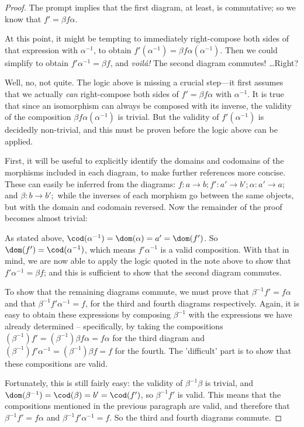 \documentclass[../../main]{subfiles}
\begin{document}
\begin{proof}
	The prompt implies that the first diagram, at least, is
	commutative; so we know that \(f' = \beta f \alpha \).

	At this point, it might be tempting to immediately right-compose both sides
	of that expression with \(\alpha^{-1}\), to obtain \(f'(\alpha^{-1}) = \beta
	f \alpha(\alpha^{-1})\). Then we could simplify to obtain \(f' \alpha^{-1} =
	\beta f\), and \textit{voil\'{a}!} The second diagram commutes! \dots Right?

	Well, no, not quite. The logic above is missing a crucial step---it first
	assumes that we actually \textit{can} right-compose both sides of \(f' =
	\beta f \alpha \) with \(\alpha^{-1}\). It is true that since an isomorphism
	can always be composed with its inverse, the validity of the composition
	\(\beta f \alpha (\alpha^{-1})\) is trivial. But the validity of \(f'
	(\alpha^{-1})\) is decidedly non-trivial, and this must be proven before the
	logic above can be applied.

	First, it will be useful to explicitly identify the domains and codomains of the
	morphisms included in each diagram, to make further references more concise.
	These can easily be inferred from the diagrams: \(f \colon a \to b; f' \colon a'
	\to b'; \alpha \colon a' \to a;\) and \(\beta \colon b \to b';\) while the
	inverses of each morphism go between the same objects, but with the domain and
	codomain reversed. Now the remainder of the proof becomes almost trivial:

	As stated above, \(\cod(\alpha^{-1}) = \dom(\alpha) = a' = \dom (f')\). So
	\(\dom(f') = \cod(\alpha^{-1})\), which means \(f' \alpha^{-1}\) is a valid
	composition. With that in mind, we are now able to apply the logic quoted in the
	note above to show that \(f' \alpha^{-1} = \beta f\); and this is sufficient to
	show that the second diagram commutes.

	To show that the remaining diagrams commute, we must prove that \(\beta^{-1} f'
	= f \alpha\) and that \(\beta^{-1} f' \alpha^{-1} = f\), for the third and
	fourth diagrams respectively. Again, it is easy to obtain these expressions by
	composing \(\beta^{-1}\) with the expressions we have already determined --
	specifically, by taking the compositions \((\beta^{-1})f' = (\beta^{-1})\beta f
	\alpha = f \alpha\) for the third diagram and \((\beta^{-1})f' \alpha^{-1} =
	(\beta^{-1})\beta f = f\) for the fourth. The 'difficult' part is to show that
	these compositions are valid.

	Fortunately, this is still fairly easy: the validity of \(\beta^{-1} \beta\) is
	trivial, and \(\dom(\beta^{-1}) = \cod(\beta) = b' = \cod(f')\), so \(\beta^{-1}
	f'\) is valid. This means that the compositions mentioned in the previous
	paragraph are valid, and therefore that \(\beta^{-1} f' = f \alpha\) and
	\(\beta^{-1} f' \alpha^{-1} = f\). So the third and fourth diagrams commute.
\end{proof}
\end{document}
